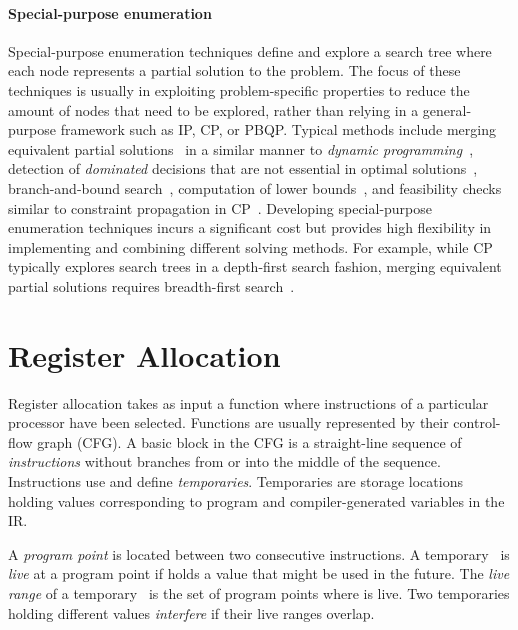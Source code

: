 \documentclass[acmsmall,authorversion,nonacm]{acmart}
\begin{document}
\paragraph{Special-purpose enumeration}

Special-purpose enumeration techniques define and explore a search
tree where each node represents a partial solution to the problem.
The focus of these techniques is usually in exploiting
problem-specific properties to reduce the amount of nodes that need to
be explored, rather than relying in a general-purpose framework such
as IP, CP, or PBQP.
Typical methods include merging equivalent partial
solutions~\cite{Kessler2001} in a similar manner to \emph{dynamic
  programming}~\cite{Cormen2009}, detection of \emph{dominated}
decisions that are not essential in optimal
solutions~\cite{Ramamoorthy1972}, branch-and-bound
search~\cite{Shobaki2004}, computation of lower
bounds~\cite{Rim1994,Langevin1996}, and feasibility checks similar to
constraint propagation in CP~\cite{Shobaki2004}.
Developing special-purpose enumeration techniques incurs a significant
cost but provides high flexibility in implementing and combining
different solving methods.
For example, while CP typically explores search trees in a depth-first
search fashion, merging equivalent partial solutions requires
breadth-first search~\cite{Kessler2001}.

\section{Register Allocation}\label{sec:register-allocation}

Register allocation takes as input a function where instructions of a
particular processor have been selected.
Functions are usually represented by their control-flow graph (CFG).
A basic block in the CFG is a straight-line sequence of
\emph{instructions} without branches from or into the middle of the
sequence.
Instructions use and define \emph{temporaries}.
Temporaries are storage locations holding values corresponding to
program and compiler-generated variables in the IR.

A \emph{program point} is located between two consecutive instructions.
A temporary~ is \emph{live} at a program point if  holds a value
that might be used in the future.
The \emph{live range} of a temporary~ is the set of program points
where  is live.
Two temporaries holding different values \emph{interfere} if their
live ranges overlap.
\end{document}

